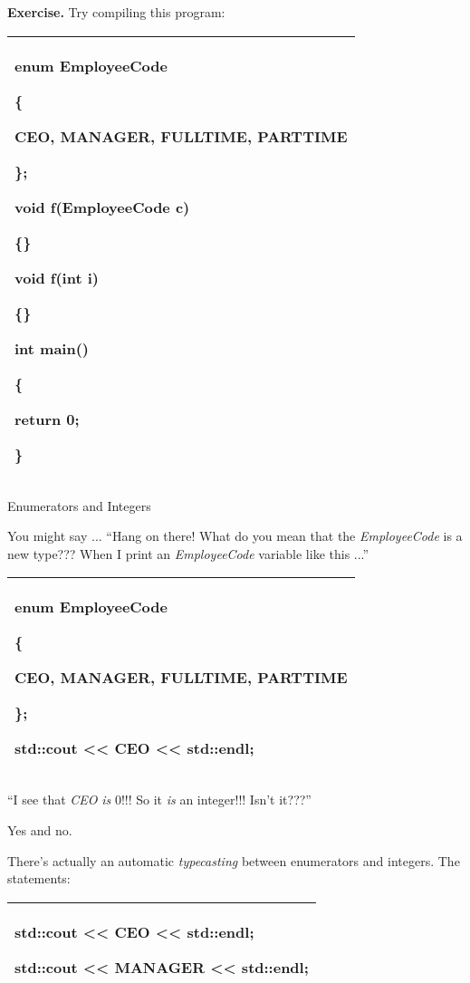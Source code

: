 \documentclass[
]{article}
\begin{document}
\textbf{Exercise.} Try compiling this program:

\begin{longtable}[]{@{}l@{}}
\toprule
\endhead
\begin{minipage}[t]{0.97\columnwidth}\raggedright
enum EmployeeCode

\{

CEO, MANAGER, FULLTIME, PARTTIME

\};

void f(EmployeeCode c)

\{\}

void f(int i)

\{\}

int main()

\{

return 0;

\}\strut
\end{minipage}\tabularnewline
\bottomrule
\end{longtable}

Enumerators and Integers

You might say ... ``Hang on there! What do you mean that the
\emph{EmployeeCode} is a new type??? When I print an \emph{EmployeeCode}
variable like this ...''

\begin{longtable}[]{@{}l@{}}
\toprule
\endhead
\begin{minipage}[t]{0.97\columnwidth}\raggedright
enum EmployeeCode

\{

CEO, MANAGER, FULLTIME, PARTTIME

\};

std::cout \textless\textless{} CEO \textless\textless{} std::endl;\strut
\end{minipage}\tabularnewline
\bottomrule
\end{longtable}

``I see that \emph{CEO} \emph{is} 0!!! So it \emph{is} an integer!!!
Isn't it???''

Yes and no.

There's actually an automatic \emph{typecasting} between enumerators and
integers. The statements:

\begin{longtable}[]{@{}l@{}}
\toprule
\endhead
\begin{minipage}[t]{0.97\columnwidth}\raggedright
std::cout \textless\textless{} CEO \textless\textless{} std::endl;

std::cout \textless\textless{} MANAGER \textless\textless{}
std::endl;\strut
\end{minipage}\tabularnewline
\bottomrule
\end{longtable}
\end{document}
